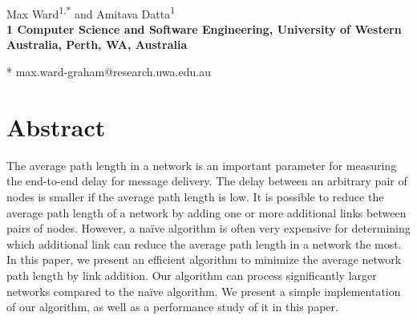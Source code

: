 \documentclass[10pt,letterpaper]{article}
\date{}
\begin{document}
\vspace*{0.35in}

\begin{flushleft}
{\Large
\textbf{}
}
\newline
\\
Max Ward\textsuperscript{1,*} and
Amitava Datta\textsuperscript{1}
\\
\bigskip
\bf{1} Computer Science and Software Engineering, University of Western Australia, Perth, WA, Australia
\\
\bigskip

* max.ward-graham@research.uwa.edu.au

\end{flushleft}
\section*{Abstract}
The average path length in a network is an important parameter for measuring the 
end-to-end delay for message delivery. The delay between an arbitrary pair of nodes 
is smaller if the average path length is low. It is possible to reduce the average
path length of a network by adding one or more additional links between pairs of nodes.
However, a na\"ive algorithm is often very expensive for determining which additional link 
can reduce the average path length in a network the most. In this paper, we present 
an efficient algorithm to minimize the average network path length by link addition.  
Our algorithm can process significantly larger networks compared to the na\"ive 
algorithm. We present a simple implementation of our algorithm, as well as a performance 
study of it in this paper.  


\linenumbers
\end{document}
